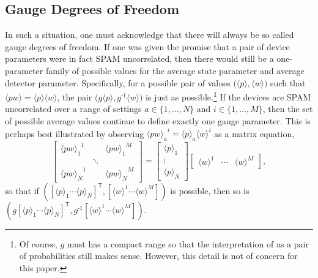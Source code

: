 \documentclass[pra, 10pt, notitlepage, twocolumn]{revtex4-1}
\newcommand{\inv}{\text{-1}}
\newcommand{\T}{\mathsf{T}}
\begin{document}
\subsection{Gauge Degrees of Freedom}

In such a situation, one must acknowledge that there will always be so called gauge degrees of freedom.
If one was given the promise that a pair of device parameters were in fact SPAM uncorrelated,
then there would still be a one-parameter family of possible values for the average state parameter and average detector parameter.
Specifically, for a possible pair of values $\big(\langle p\rangle,\langle w\rangle\big)$ such that $\langle pw \rangle = \langle p\rangle\langle w\rangle$,
the pair $\big(g\langle p\rangle, g^\inv\langle w\rangle\big)$ is just as possible.\footnote{
Of course, $g$ must has a compact range so that the interpretation of \unexpanded{$\big(g\langle p\rangle, g^\inv\langle w\rangle\big)$} as a pair of probabilities still makes sense.
However, this detail is not of concern for this paper.}
If the devices are SPAM uncorrelated over a range of settings $a\in\{1,\ldots,N\}$ and $i\in\{1,\ldots,M\}$,
then the set of possible average values continue to define exactly one gauge parameter.
This is perhaps best illustrated by observing ${\langle pw \rangle_a}^i = \langle p \rangle_a\langle w \rangle^i$ as a matrix equation,
\begin{equation}\label{globaleff}
\left[
\begin{array}{ccc}
	{\langle pw \rangle_1}^1	&&	{\langle pw \rangle_1}^M	\\
		&	\ddots	&	\\
	{\langle pw \rangle_N}^1	&&	{\langle pw \rangle_N}^M	
\end{array}
\right]
=
\left[
\begin{array}{c}
	\langle p \rangle_1	\\
	\vdots	\\
	\langle p \rangle_N	
\end{array}
\right]
\left[
\begin{array}{ccc}
	\langle w \rangle^1	&	\cdots &	\langle w \rangle^M
\end{array}
\right],
\end{equation}
so that if $\left(\left[\langle p \rangle_1 \cdots \langle p \rangle_N\right]^\T,\left[\langle w \rangle^1 \cdots \langle w \rangle^M\right]\right)$ is possible,
then so is $\left(g\left[\langle p \rangle_1 \cdots \langle p \rangle_N\right]^\T,g^\inv\left[\langle w \rangle^1 \cdots \langle w \rangle^M\right]\right)$.
\end{document}
